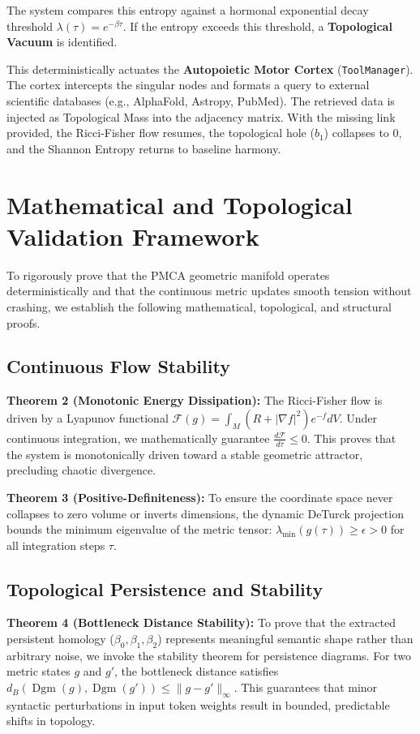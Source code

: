 \documentclass[12pt, a4paper]{article}
\begin{document}
The system compares this entropy against a hormonal exponential decay threshold $\lambda(\tau) = e^{-\beta \tau}$. If the entropy exceeds this threshold, a \textbf{Topological Vacuum} is identified.

This deterministically actuates the \textbf{Autopoietic Motor Cortex} (\texttt{ToolManager}). The cortex intercepts the singular nodes and formats a query to external scientific databases (e.g., AlphaFold, Astropy, PubMed). The retrieved data is injected as Topological Mass into the adjacency matrix. With the missing link provided, the Ricci-Fisher flow resumes, the topological hole ($b_1$) collapses to $0$, and the Shannon Entropy returns to baseline harmony.

\section{Mathematical and Topological Validation Framework}

To rigorously prove that the PMCA geometric manifold operates deterministically and that the continuous metric updates smooth tension without crashing, we establish the following mathematical, topological, and structural proofs.

\subsection{Continuous Flow Stability}
\textbf{Theorem 2 (Monotonic Energy Dissipation):} 
The Ricci-Fisher flow is driven by a Lyapunov functional $\mathcal{F}(g) = \int_M (R + |\nabla f|^2)e^{-f} dV$. Under continuous integration, we mathematically guarantee $\frac{d\mathcal{F}}{d\tau} \le 0$. This proves that the system is monotonically driven toward a stable geometric attractor, precluding chaotic divergence.

\textbf{Theorem 3 (Positive-Definiteness):} 
To ensure the coordinate space never collapses to zero volume or inverts dimensions, the dynamic DeTurck projection bounds the minimum eigenvalue of the metric tensor: $\lambda_{\min}(g(\tau)) \ge \epsilon > 0$ for all integration steps $\tau$.

\subsection{Topological Persistence and Stability}
\textbf{Theorem 4 (Bottleneck Distance Stability):}
To prove that the extracted persistent homology ($\beta_0, \beta_1, \beta_2$) represents meaningful semantic shape rather than arbitrary noise, we invoke the stability theorem for persistence diagrams. For two metric states $g$ and $g'$, the bottleneck distance satisfies $d_B(\operatorname{Dgm}(g), \operatorname{Dgm}(g')) \le \|g - g'\|_\infty$. This guarantees that minor syntactic perturbations in input token weights result in bounded, predictable shifts in topology.
\end{document}

